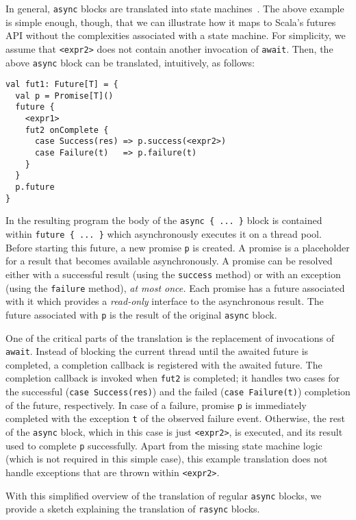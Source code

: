 \documentclass{acm_proc_article-sp}
\begin{document}
In general, \verb|async| blocks are translated into state
machines~\cite{ScalaAsyncSIP}. The above example is simple enough, though,
that we can illustrate how it maps to Scala's futures API without the
complexities associated with a state machine. For simplicity, we assume that
\verb|<expr2>| does not contain another invocation of \verb|await|. Then, the
above \verb|async| block can be translated, intuitively, as follows:

\begin{lstlisting}
val fut1: Future[T] = {
  val p = Promise[T]()
  future {
    <expr1>
    fut2 onComplete {
      case Success(res) => p.success(<expr2>)
      case Failure(t)   => p.failure(t)
    }
  }
  p.future
}
\end{lstlisting}

In the resulting program the body of the \verb|async { ... }| block is
contained within \verb|future { ... }| which asynchronously executes it on a
thread pool. Before starting this future, a new promise \verb|p| is created. A
promise is a placeholder for a result that becomes available asynchronously. A
promise can be resolved either with a successful result (using the
\verb|success| method) or with an exception (using the \verb|failure| method),
{\em at most once.} Each promise has a future associated with it which
provides a {\em read-only} interface to the asynchronous result. The future
associated with \verb|p| is the result of the original \verb|async| block.

One of the critical parts of the translation is the replacement of invocations
of \verb|await|. Instead of blocking the current thread until the awaited
future is completed, a completion callback is registered with the awaited
future. The completion callback is invoked when \verb|fut2| is completed; it
handles two cases for the successful (\verb|case Success(res)|) and the failed
(\verb|case Failure(t)|) completion of the future, respectively. In case of a
failure, promise \verb|p| is immediately completed with the exception \verb|t|
of the observed failure event. Otherwise, the rest of the \verb|async| block,
which in this case is just \verb|<expr2>|, is executed, and its result used to
complete \verb|p| successfully. Apart from the missing state machine logic
(which is not required in this simple case), this example translation does not
handle exceptions that are thrown within \verb|<expr2>|.

With this simplified overview of the translation of regular \verb|async|
blocks, we provide a sketch explaining the translation of \verb|rasync|
blocks.
\end{document}
